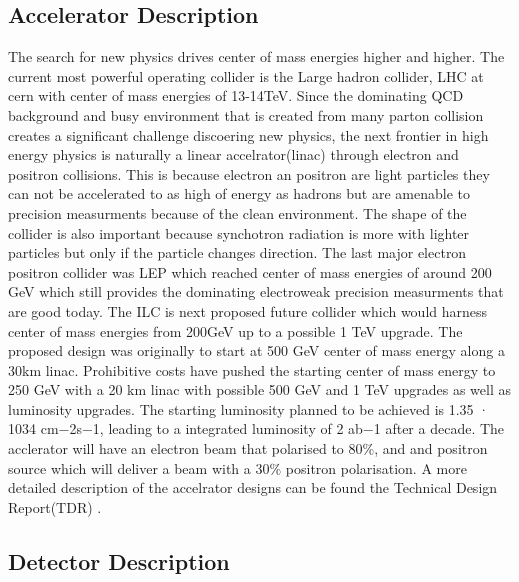 \subsection{Accelerator Description}
\label{ilc}


The search for new physics drives center of mass energies higher and higher. The current most powerful operating collider is the Large hadron collider, LHC at cern with center of mass energies of 13-14TeV. Since the dominating QCD background and busy environment that is created from many parton collision creates a significant challenge discoering new physics, the next frontier in high energy physics is naturally a linear accelrator(linac) through electron and positron collisions. This is because electron an positron are light particles they can not be accelerated to as high of energy as hadrons but are amenable to precision measurments because of the clean environment. The shape of the collider is also important because synchotron radiation is more with lighter particles but only if the particle changes direction.  The last major electron positron collider was LEP which reached center of mass energies of around 200 GeV which still provides the dominating electroweak precision measurments that are good today.  The ILC is next proposed future collider which would harness center of mass energies from 200GeV up to a possible 1 TeV upgrade.  The proposed design was originally to start at 500 GeV center of mass energy along a 30km linac. Prohibitive costs have pushed the starting center of mass energy to 250 GeV  with a 20 km linac with possible 500 GeV and 1 TeV upgrades as well as luminosity upgrades.  The starting luminosity planned to be achieved is 1.35 · 1034 cm−2s−1, leading to a integrated luminosity of  2 ab−1 after a decade. The acclerator will have an electron beam that 
polarised to $80\%$, and and positron source which will deliver a beam with a $30 \%$ positron polarisation.\cite{currdetector} A more detailed description of the accelrator designs can be found the Technical Design Report(TDR) \cite{TDR}.

\subsection{Detector Description}
\label{ild}

